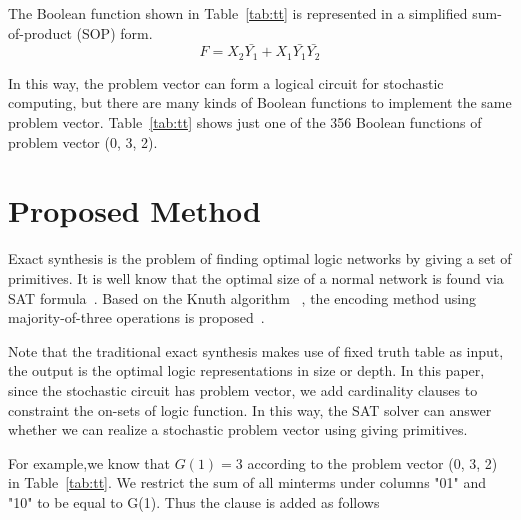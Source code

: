 \documentclass[conference,letterpaper]{IEEEtran}
\begin{document}
The Boolean function shown in Table~\ref{tab:tt} is represented in a simplified sum-of-product (SOP) form.
\begin{equation}
F=X_{2}\bar{Y_{1}}+X_{1} \bar{Y_{1}}\bar{Y_{2}}
\end{equation}

In this way, the problem vector can form a logical circuit for stochastic computing, but there are many kinds of Boolean functions to implement the same problem vector. Table~\ref{tab:tt} shows just one of the 356 Boolean functions of problem vector (0, 3, 2).


\section*{Proposed Method}
Exact synthesis is the problem of finding optimal logic networks by giving a set of primitives. 
It is well know that the optimal size of a normal network is found via SAT formula~\cite{3}. Based on the Knuth algorithm ~\cite{4}, the encoding method using majority-of-three operations is proposed~\cite{6}. 

Note that the traditional exact synthesis makes use of fixed truth table as input, the output is the optimal logic representations in size or depth.
In this paper, since the stochastic circuit has problem vector, we add cardinality clauses to constraint the on-sets of logic function. In this way, the SAT solver can answer whether we can realize a stochastic problem vector using giving primitives. 

For example,we know that $G(1) = 3$ according to the problem vector (0, 3, 2) in Table~\ref{tab:tt}. We restrict the sum of all minterms under columns "01" and "10" to be equal to G(1). Thus the clause is added as follows
\begin{equation}
\end{equation}

\end{document}

